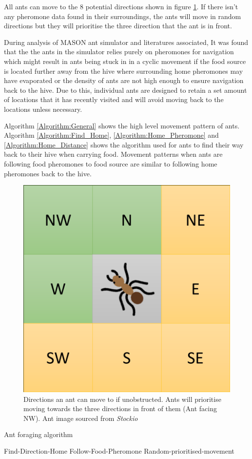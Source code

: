 \documentclass[a4paper, oneside, 11pt]{report}
\begin{document}
All ants can move to the 8 potential directions shown in figure \ref{fig:Ant_Direction}. If there isn't any pheromone data found in their surroundings, the ants will move in random directions but they will prioritise the three direction that the ant is in front. 

During analysis of MASON ant simulator and literatures associated, It was found that the the ants in the simulator relies purely on pheromones for navigation  which might result in ants being stuck in in a cyclic movement if the food source is located further away from the hive where surrounding home pheromones may have evaporated or the density of ants are not high enough to ensure navigation back to the hive. Due to this, individual ants are designed to retain a set amount of locations that it has  recently visited and will avoid moving back to the locations unless necessary. 

Algorithm \ref{Algorithm:General} shows the high level movement pattern of ants. Algorithm \ref{Algorithm:Find_Home}, \ref{Algorithm:Home_Pheromone} and \ref{Algorithm:Home_Distance} shows the algorithm used for ants to find their way back to their hive when carrying food. Movement patterns when ants are following food pheromones to food source are similar to following home pheromones back to the hive.

\begin{figure}[htb]
	\begin{center}
	\includegraphics[width=0.35 \columnwidth]{Ant_direction.png}
	\caption{Directions an ant can move to if unobstructed. Ants will prioritise moving towards the three directions in front of them (Ant facing NW). Ant image sourced from \textit{Stockio}}
	\label{fig:Ant_Direction}
	\end{center}
\end{figure}

\begin{algorithm}[th]
\caption{ Ant foraging algorithm } \label{Algorithm:General}
\begin{algorithmic}[1] 
		\State Find-Direction-Home
		\State Follow-Food-Pheromone
	\Else
		\State Random-prioritised-movement
	\EndIf
\end{algorithmic}
\end{algorithm}
\end{document}
